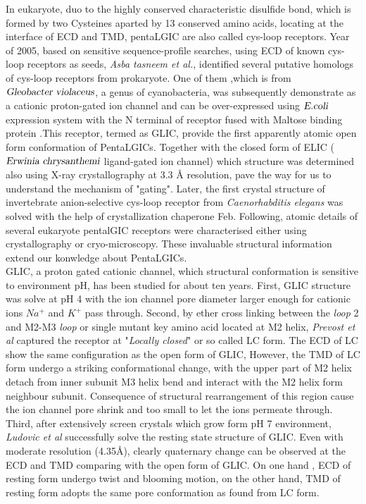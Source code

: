 \documentclass[12pt,a4paper,]{article}
\begin{document}
	
	In eukaryote, duo to the highly conserved characteristic disulfide bond, which is formed by two Cysteines aparted by 13 conserved amino acids, locating at the interface of  ECD and TMD,  pentaLGIC are also called cys-loop receptors. Year of 2005, based on sensitive sequence-profile searches, using ECD of known cys-loop receptors as seeds,  \textsl{Asba tasneem et al.}, identified several putative homologs of cys-loop receptors from prokaryote.
	One of them ,which is  from $\textsl{Gleobacter violaceus}$, a genus of cyanobacteria, was subsequently demonstrate as a cationic proton-gated ion channel and can be over-expressed using $\textsl{E.coli}$ expression system with the N terminal of receptor fused with Maltose binding protein \cite{boc07}.This receptor,  termed as GLIC, provide the first apparently atomic open form conformation of PentaLGICs\cite{hilf2009structure}. Together with the closed form of ELIC ($\textsl{Erwinia chrysanthemi}$ ligand-gated ion channel) which structure was determined also using X-ray crystallography at 3.3 \AA{} \cite{hilf2008x} resolution, pave the way for us to understand the mechanism of "gating". Later, the first crystal structure of invertebrate anion-selective cys-loop receptor from \textsl{Caenorhabditis elegans} was solved with the help of  crystallization chaperone Feb. Following, atomic details of several eukaryote pentalGIC receptors were characterised either using crystallography or cryo-microscopy. These invaluable structural information extend our konwledge about PentaLGICs. \\ 
	
	GLIC, a proton gated cationic channel, which structural conformation is sensitive to environment pH, has been studied for about ten years. First, GLIC structure was solve at pH 4 with the ion channel pore diameter  larger enough for cationic ions $Na^+$ and $K^+$ pass through. Second, by ether cross linking between the \textsl{loop} 2 and M2-M3  \textsl{loop} or single mutant key amino acid located at M2 helix, \textsl{Prevost et al}  captured the receptor at "\textsl{Locally closed}" or  so called LC form. The ECD of LC  show the same configuration as the open form of GLIC, However, the TMD of LC form undergo a striking conformational change, with the upper part of M2 helix detach from inner subunit M3 helix bend and interact with the M2 helix form neighbour subunit. Consequence of structural rearrangement of this region cause the ion channel pore shrink and too small to let the ions permeate through. Third, after extensively screen crystals which grow form pH 7 environment, \textsl{Ludovic et al} successfully solve the resting state structure of GLIC. Even with moderate resolution (4.35\AA{}),  clearly quaternary change can be observed at the ECD and TMD comparing  with the open form of GLIC. On one hand , ECD of resting form undergo twist and blooming motion, on the other hand, TMD of resting form adopts the same pore conformation as found from LC form.\newpage
	
\end{document}
